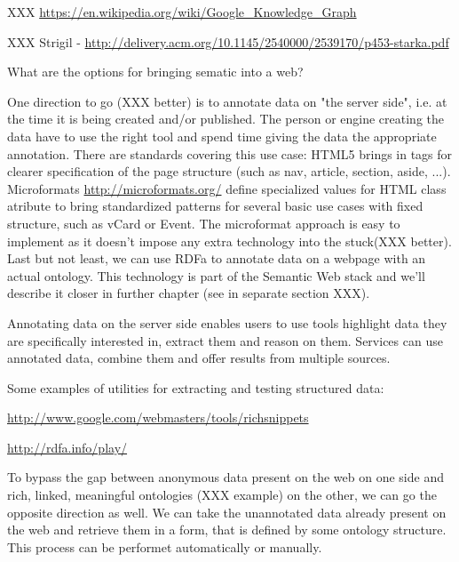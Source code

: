 XXX \url{https://en.wikipedia.org/wiki/Google_Knowledge_Graph}

XXX Strigil - \url{http://delivery.acm.org/10.1145/2540000/2539170/p453-starka.pdf}

What are the options for bringing sematic into a web? 


One direction to go (XXX better) is to annotate data on "the server side", i.e. at the time
it is being created and/or published. The person or engine creating the data have to use
the right tool and spend time giving the data the appropriate annotation. There
are standards covering this use case: HTML5 brings in tags for clearer
specification of the page structure (such as nav, article, section, aside,
...). Microformats \url{http://microformats.org/} define specialized values for
HTML class atribute to bring standardized patterns for several basic use cases
with fixed structure, such as vCard or Event. The microformat approach is easy
to implement as it doesn't impose any extra technology into the stuck(XXX
better). Last but not least, we can use RDFa to annotate data on a webpage with an
actual ontology. This technology is part of the Semantic Web stack and we'll
describe it closer in further chapter (see in separate section XXX).

Annotating data on the server side enables users to use tools highlight data
they are specifically interested in, extract them and reason on them. Services
can use annotated data, combine them and offer results from multiple sources. 

Some examples of utilities for extracting and testing structured data: 

\url{http://www.google.com/webmasters/tools/richsnippets}

\url{http://rdfa.info/play/}

To bypass the gap between anonymous data present on the web on one side and
rich, linked, meaningful ontologies (XXX example) on the other, we can go the
opposite direction as well. We can take the unannotated data already present on
the web and retrieve them in a form, that is defined by some ontology
structure. This process can be performet automatically or manually. 

